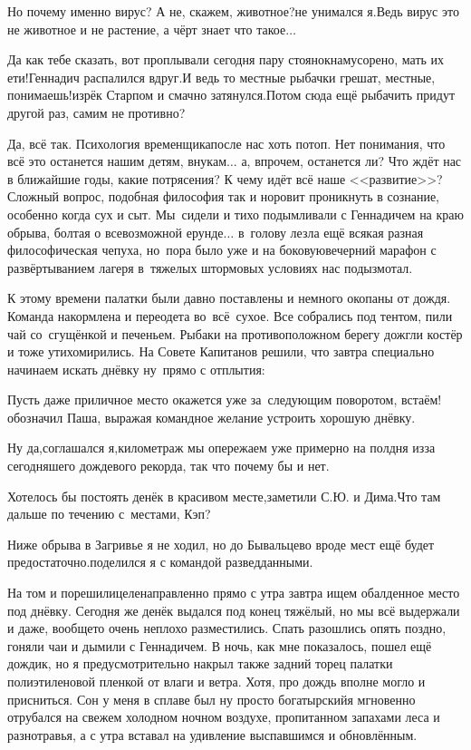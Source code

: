 \diagdash Но почему именно вирус? А не, скажем, животное?\mdash не унимался я.\mdash Ведь вирус это не животное и не растение, а чёрт знает что такое$\ldots$

\diagdash Да как тебе сказать, вот проплывали сегодня пару стоянок\mdash намусорено, мать их ети!\mdash Геннадич распалился вдруг.\mdash И ведь то местные рыбачки грешат, местные, понимаешь!\mdash изрёк Старпом и смачно затянулся.\mdash Потом сюда ещё рыбачить придут другой раз, самим не противно?

Да, всё так. Психология временщика\mdash после нас хоть потоп. Нет понимания, что всё это останется нашим детям, внукам$\ldots$ а, впрочем, останется ли? Что ждёт нас в ближайшие годы, какие потрясения? К чему идёт всё наше <<развитие>>? Сложный вопрос, подобная философия так и норовит проникнуть в сознание, особенно когда сух и сыт. Мы~сидели и тихо подымливали с Геннадичем на краю обрыва, болтая о всевозможной ерунде$\ldots$ в~голову лезла ещё всякая разная философическая чепуха, но~пора было уже и на боковую\mdash вечерний марафон с развёртыванием лагеря в~тяжелых штормовых условиях нас подызмотал.

К этому времени палатки были давно поставлены и немного окопаны от дождя. Команда накормлена и переодета во~всё~сухое. Все собрались под тентом, пили чай со~сгущёнкой и печеньем. Рыбаки на противоположном берегу дожгли костёр и тоже утихомирились. На Совете Капитанов решили, что завтра специально начинаем искать днёвку ну~прямо с отплытия:

\diagdash Пусть даже приличное место окажется уже за~следующим поворотом, встаём!\mdash обозначил Паша, выражая командное желание устроить хорошую днёвку.

\diagdash Ну да,\mdash соглашался я,\mdash километраж мы опережаем уже примерно на полдня из\sdash за сегодняшего дождевого рекорда, так что почему бы и нет.

\diagdash Хотелось бы постоять денёк в красивом месте,\mdash заметили С.Ю. и Дима.\mdash Что там дальше по течению с~местами, Кэп? 

\diagdash Ниже обрыва в Загривье я не ходил, но до Бывальцево вроде мест ещё будет предостаточно.\mdash поделился я с командой разведданными.

На том и порешили\mdash целенаправленно прямо с утра завтра ищем обалденное место под днёвку. Сегодня же денёк выдался под конец тяжёлый, но мы всё выдержали и даже, вообще\sdash то очень неплохо разместились. Спать разошлись опять поздно, гоняли чаи и дымили с Геннадичем. В ночь, как мне показалось, пошел ещё дождик, но я предусмотрительно накрыл также задний торец палатки полиэтиленовой пленкой от влаги и ветра. Хотя, про дождь вполне могло и присниться. Сон у меня в сплаве был ну просто богатырский\mdash я мгновенно отрубался на свежем холодном ночном воздухе, пропитанном запахами леса и разнотравья, а с утра вставал на удивление выспавшимся и обновлённым.%

\begin{center}
\end{center}
